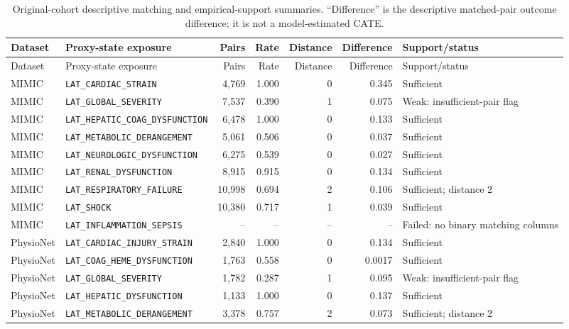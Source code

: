 \begingroup
\scriptsize
\setlength{\tabcolsep}{3pt}
\begin{longtable}{@{}lL{0.32\textwidth}rrrrL{0.20\textwidth}@{}}
\caption[Original-cohort matching and support summaries.]{Original-cohort descriptive matching and empirical-support summaries.  ``Difference'' is the descriptive matched-pair outcome difference; it is not a model-estimated CATE.}
\label{tab:results-matching-support}\\
\toprule
Dataset & Proxy-state exposure & Pairs & Rate & Distance & Difference & Support/status \\
\midrule
\endfirsthead
\toprule
Dataset & Proxy-state exposure & Pairs & Rate & Distance & Difference & Support/status \\
\midrule
\endhead
MIMIC & \nolinkurl{LAT_CARDIAC_STRAIN} & 4,769 & 1.000 & 0 & 0.345 & Sufficient \\
MIMIC & \nolinkurl{LAT_GLOBAL_SEVERITY} & 7,537 & 0.390 & 1 & 0.075 & Weak: insufficient-pair flag \\
MIMIC & \nolinkurl{LAT_HEPATIC_COAG_DYSFUNCTION} & 6,478 & 1.000 & 0 & 0.133 & Sufficient \\
MIMIC & \nolinkurl{LAT_METABOLIC_DERANGEMENT} & 5,061 & 0.506 & 0 & 0.037 & Sufficient \\
MIMIC & \nolinkurl{LAT_NEUROLOGIC_DYSFUNCTION} & 6,275 & 0.539 & 0 & 0.027 & Sufficient \\
MIMIC & \nolinkurl{LAT_RENAL_DYSFUNCTION} & 8,915 & 0.915 & 0 & 0.134 & Sufficient \\
MIMIC & \nolinkurl{LAT_RESPIRATORY_FAILURE} & 10,998 & 0.694 & 2 & 0.106 & Sufficient; distance 2 \\
MIMIC & \nolinkurl{LAT_SHOCK} & 10,380 & 0.717 & 1 & 0.039 & Sufficient \\
MIMIC & \nolinkurl{LAT_INFLAMMATION_SEPSIS} & -- & -- & -- & -- & Failed: no binary matching columns \\
\addlinespace
PhysioNet & \nolinkurl{LAT_CARDIAC_INJURY_STRAIN} & 2,840 & 1.000 & 0 & 0.134 & Sufficient \\
PhysioNet & \nolinkurl{LAT_COAG_HEME_DYSFUNCTION} & 1,763 & 0.558 & 0 & 0.0017 & Sufficient \\
PhysioNet & \nolinkurl{LAT_GLOBAL_SEVERITY} & 1,782 & 0.287 & 1 & 0.095 & Weak: insufficient-pair flag \\
PhysioNet & \nolinkurl{LAT_HEPATIC_DYSFUNCTION} & 1,133 & 1.000 & 0 & 0.137 & Sufficient \\
PhysioNet & \nolinkurl{LAT_METABOLIC_DERANGEMENT} & 3,378 & 0.757 & 2 & 0.073 & Sufficient; distance 2 \\

\end{longtable}
